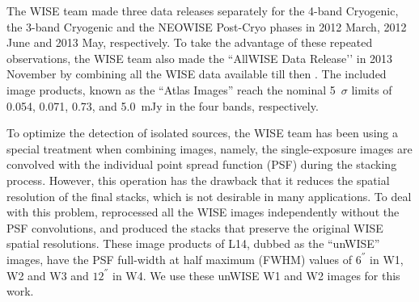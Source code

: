 \documentclass[apj,iop]{emulateapj}
\begin{document}
The WISE team made three data releases separately for the 4-band Cryogenic, the 3-band Cryogenic and the NEOWISE Post-Cryo phases in 2012 March, 2012 June and 2013 May, respectively. To take the advantage of these repeated observations, the WISE team also made the ``AllWISE Data Release’’ in 2013 November by combining all the WISE data available till then \citep[see][for details]{2013wise.rept....1C}. The included image products,
known as the ``Atlas Images'' reach the nominal 5~$\sigma$ limits of 0.054, 0.071, 0.73, and 5.0~mJy in the four bands, respectively. 

To optimize the detection of isolated sources, the WISE team has been using a special treatment when combining images, namely, the single-exposure images are convolved with the individual point spread function (PSF) during the stacking process. However, this operation has the drawback that it reduces the spatial resolution of the final stacks, which is not desirable in many applications. To deal with this problem, \citet[][hereafter L14]{Lang2014e} reprocessed all the WISE images independently without the PSF convolutions, and produced the stacks that preserve the original WISE spatial resolutions. These image products of L14,  dubbed as the ``unWISE'' images, have the PSF full-width at half maximum (FWHM) values of $6^{''}$ in W1, W2 and W3 and $12^{''}$ in W4. We use these unWISE W1 and W2 images for this work.
\end{document}
